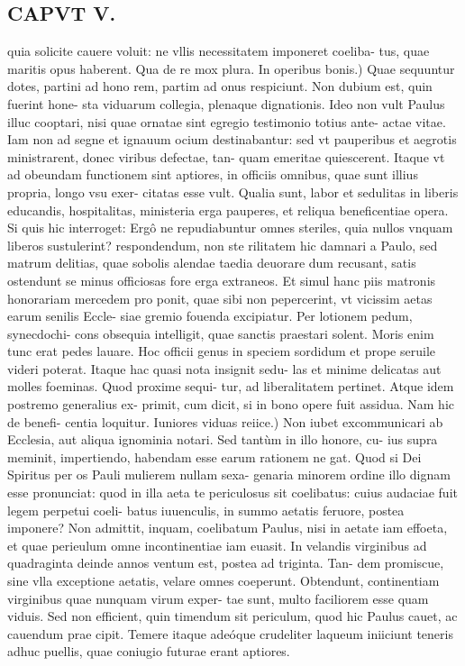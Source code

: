 \documentclass{article}
\begin{document}
\begin{pages}
\section*{CAPVT V. }
\marginpar{[ p.61 ]}\pstart quia solicite cauere voluit: ne vllis necessitatem imponeret coeliba- tus, quae maritis opus haberent. Qua de re mox plura.  \pend\pstart In operibus bonis.) Quae sequuntur dotes, partini ad hono rem, partim ad onus respiciunt. Non dubium est, quin fuerint hone- sta viduarum collegia, plenaque dignationis. Ideo non vult Paulus illuc cooptari, nisi quae ornatae sint egregio testimonio totius ante- actae vitae. Iam non ad segne et ignauum ocium destinabantur: sed vt pauperibus et aegrotis ministrarent, donec viribus defectae, tan- quam emeritae quiescerent. Itaque vt ad obeundam functionem sint aptiores, in officiis omnibus, quae sunt illius propria, longo vsu exer- citatas esse vult. Qualia sunt, labor et sedulitas in liberis educandis, hospitalitas, ministeria erga pauperes, et reliqua beneficentiae opera. Si quis hic interroget: Ergô ne repudiabuntur omnes steriles, quia nullos vnquam liberos sustulerint? respondendum, non ste rilitatem hic damnari a Paulo, sed matrum delitias, quae sobolis alendae taedia deuorare dum recusant, satis ostendunt se minus officiosas fore erga extraneos. Et simul hanc piis matronis honorariam mercedem pro ponit, quae sibi non pepercerint, vt vicissim aetas earum senilis Eccle- siae gremio fouenda excipiatur. Per lotionem pedum, synecdochi- cons obsequia intelligit, quae sanctis praestari solent. Moris enim tunc erat pedes lauare. Hoc officii genus in speciem sordidum et prope seruile videri poterat. Itaque hac quasi nota insignit sedu- las et minime delicatas aut molles foeminas. Quod proxime sequi- tur, ad liberalitatem pertinet. Atque idem postremo generalius ex- primit, cum dicit, si in bono opere fuit assidua. Nam hic de benefi- centia loquitur.  \pend\pstart Iuniores viduas reiice.) Non iubet excommunicari ab Ecclesia, aut aliqua ignominia notari. Sed tantùm in illo honore, cu- ius supra meminit, impertiendo, habendam esse earum rationem ne gat. Quod si Dei Spiritus per os Pauli mulierem nullam sexa- genaria minorem ordine illo dignam esse pronunciat: quod in illa aeta te periculosus sit coelibatus: cuius audaciae fuit legem perpetui coeli- batus iuuenculis, in summo aetatis feruore, postea imponere? Non admittit, inquam, coelibatum Paulus, nisi in aetate iam effoeta, et quae perieulum omne incontinentiae iam euasit. In velandis virginibus ad quadraginta deinde annos ventum est, postea ad triginta. Tan- dem promiscue, sine vlla exceptione aetatis, velare omnes coeperunt. Obtendunt, continentiam virginibus quae nunquam virum exper- tae sunt, multo faciliorem esse quam viduis. Sed non efficient, quin timendum sit periculum, quod hic Paulus cauet, ac cauendum prae cipit. Temere itaque adeóque crudeliter laqueum iniiciunt teneris adhuc puellis, quae coniugio futurae erant aptiores.  \pend

\end{pages}
\end{document}
